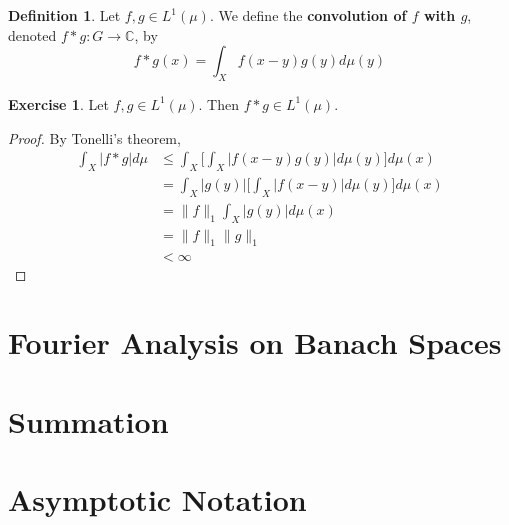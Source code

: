 \documentclass{book}
\theoremstyle{definition}
\newtheorem{defn}[definition]{Definition}
\newtheorem{ex}[definition]{Exercise}
\newcommand{\C}{\mathbb{C}}
\newcommand{\lex}[1]{\label{ex:#1}}
\newcommand{\ld}[1]{\label{defn:#1}}
\DeclareMathOperator*{\0}{\mbf{0}}
\DeclareMathOperator*{\1}{\mbf{1}}
\begin{document}
	\begin{defn} \ld{00000} 
	Let $f, g \in L^1(\mu)$. We define the \textbf{convolution of $f$ with $g$}, denoted $f * g: G \rightarrow \C$, by $$ f * g(x) = \int_X f(x-y)g(y) d\mu(y)$$
	\end{defn}
	
	\begin{ex} \lex{00000} 
	Let $f, g \in L^1(\mu)$. Then $f * g \in L^1(\mu)$. 
	\end{ex}
	
	\begin{proof}
	By Tonelli's theorem, 
	\begin{align*}
	\int_X |f *g| d\mu 
	&\leq \int_X \bigg[  \int_X |f(x-y)g(y)| d\mu(y) \bigg] d\mu(x) \\
	&= \int_X |g(y)| \bigg[  \int_X |f(x-y)| d\mu(y) \bigg] d\mu(x) \\
	&=  \|f\|_1 \int_X |g(y)| d\mu(x) \\
	&= \|f\|_1 \|g\|_1\\
	& < \infty
	\end{align*}
	\end{proof}

























\newpage
\chapter{Fourier Analysis on Banach Spaces}
	
	
	

\appendix

\chapter{Summation}


\newpage	

\chapter{Asymptotic Notation}
\end{document}
